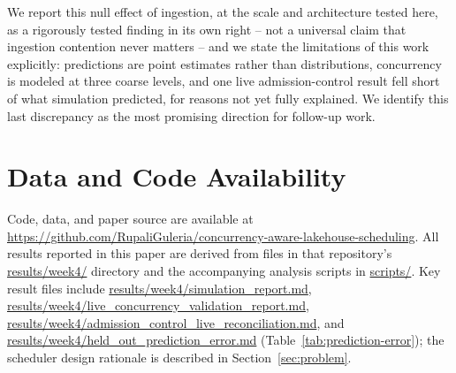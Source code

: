 \documentclass[conference]{IEEEtran}
\begin{document}
We report this null effect of ingestion, at the scale and architecture tested here, as a rigorously tested finding in its own right -- not a universal claim that ingestion contention never matters -- and we state the limitations of this work explicitly: predictions are point estimates rather than distributions, concurrency is modeled at three coarse levels, and one live admission-control result fell short of what simulation predicted, for reasons not yet fully explained. We identify this last discrepancy as the most promising direction for follow-up work.

\section*{Data and Code Availability}

Code, data, and paper source are available at \url{https://github.com/RupaliGuleria/concurrency-aware-lakehouse-scheduling}. All results reported in this paper are derived from files in that repository's \url{results/week4/} directory and the accompanying analysis scripts in \url{scripts/}. Key result files include \url{results/week4/simulation_report.md}, \url{results/week4/live_concurrency_validation_report.md}, \url{results/week4/admission_control_live_reconciliation.md}, and \url{results/week4/held_out_prediction_error.md} (Table~\ref{tab:prediction-error}); the scheduler design rationale is described in Section~\ref{sec:problem}.



\end{document}
